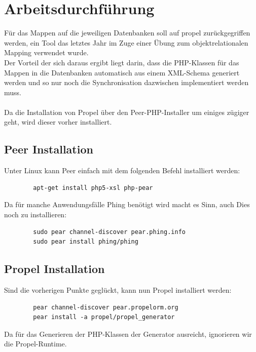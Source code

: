 \documentclass[a4paper]{article}
\begin{document}
	\section{Arbeitsdurchführung}
	Für das Mappen auf die jeweiligen Datenbanken soll auf propel zurückgegriffen werden, ein Tool das letztes Jahr im Zuge einer Übung zum objektrelationalen Mapping verwendet wurde.\\
	Der Vorteil der sich daraus ergibt liegt darin, dass die PHP-Klassen für das Mappen in die Datenbanken automatisch aus einem XML-Schema generiert werden und so nur noch die Synchronisation dazwischen implementiert werden muss.\\
	\\
	Da die Installation von Propel über den Peer-PHP-Installer um einiges zügiger geht, wird dieser vorher installiert.
	
	\subsection{Peer Installation}
	Unter Linux kann Peer einfach mit dem folgenden Befehl installiert werden:
	\begin{lstlisting}
		apt-get install php5-xsl php-pear
	\end{lstlisting}
	Da für manche Anwendungsfälle Phing benötigt wird macht es Sinn, auch Dies noch zu installieren:
	\begin{lstlisting}
		sudo pear channel-discover pear.phing.info
		sudo pear install phing/phing
	\end{lstlisting}
	\subsection{Propel Installation}
	Sind die vorherigen Punkte geglückt, kann nun Propel installiert werden:
	\begin{lstlisting}
		pear channel-discover pear.propelorm.org
		pear install -a propel/propel_generator
	\end{lstlisting}
	Da für das Generieren der PHP-Klassen der Generator ausreicht, ignorieren wir die Propel-Runtime.
	
\end{document}
